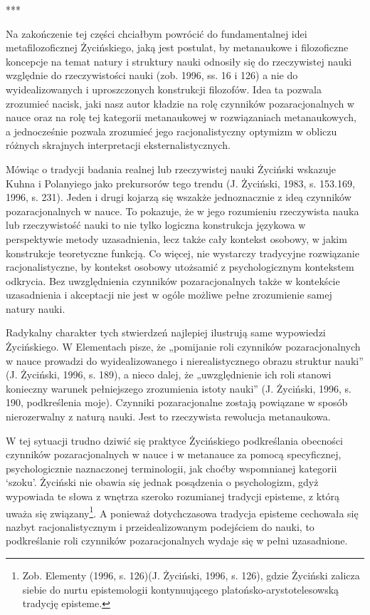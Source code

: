 \documentclass{article}
\begin{document}
***

Na zakończenie tej części chciałbym powrócić do fundamentalnej idei metafilozoficznej Życińskiego, jaką jest postulat,
by metanaukowe i filozoficzne koncepcje na temat natury i struktury nauki odnosiły się do rzeczywistej nauki względnie
do rzeczywistości nauki (zob. 1996, ss. 16 i 126) a nie do wyidealizowanych i uproszczonych konstrukcji filozofów. Idea
ta pozwala zrozumieć nacisk, jaki nasz autor kładzie na rolę czynników pozaracjonalnych w nauce oraz na rolę tej
kategorii metanaukowej w rozwiązaniach metanaukowych, a jednocześnie pozwala zrozumieć jego racjonalistyczny optymizm w
obliczu różnych skrajnych interpretacji eksternalistycznych.

Mówiąc o tradycji badania realnej lub rzeczywistej nauki Życiński wskazuje Kuhna i Polanyiego jako prekursorów tego
trendu \label{ref:RNDi6TPvuVUK4}(J. Życiński, 1983, s. 153.169, 1996, s. 231). Jeden i drugi kojarzą się wszakże
jednoznacznie z ideą czynników pozaracjonalnych w nauce. To pokazuje, że w jego rozumieniu rzeczywista nauka lub
rzeczywistość nauki to nie tylko logiczna konstrukcja językowa w perspektywie metody uzasadnienia, lecz także cały
kontekst osobowy, w jakim konstrukcje teoretyczne funkcją. Co więcej, nie wystarczy tradycyjne rozwiązanie
racjonalistyczne, by kontekst osobowy utożsamić z psychologicznym kontekstem odkrycia. Bez uwzględnienia czynników
pozaracjonalnych także w kontekście uzasadnienia i akceptacji nie jest w ogóle możliwe pełne zrozumienie samej natury
nauki.

Radykalny charakter tych stwierdzeń najlepiej ilustrują same wypowiedzi Życińskiego. W Elementach pisze, że „pomijanie
roli czynników pozaracjonalnych w nauce prowadzi do wyidealizowanego i nierealistycznego obrazu struktur nauki”
\label{ref:RND07iSFRLobf}(J. Życiński, 1996, s. 189), a nieco dalej, że „uwzględnienie ich roli stanowi konieczny
warunek pełniejszego zrozumienia istoty nauki” \label{ref:RNDVV3U1jSC9D}(J. Życiński, 1996, s. 190, podkreślenia moje).
 Czynniki pozaracjonalne zostają powiązane w sposób nierozerwalny z naturą nauki. Jest to rzeczywista rewolucja
metanaukowa.

W tej sytuacji trudno dziwić się praktyce Życińskiego podkreślania obecności czynników pozaracjonalnych w nauce i w
metanauce za pomocą specyficznej, psychologicznie naznaczonej terminologii, jak choćby wspomnianej kategorii ‘szoku’.
Życiński nie obawia się jednak posądzenia o psychologizm, gdyż wypowiada te słowa z wnętrza szeroko rozumianej tradycji
episteme, z którą uważa się związany\footnote{Zob. Elementy (1996, s. 126)\label{ref:RNDxQIHHr1tkz}(J. Życiński, 1996,
s. 126), gdzie Życiński zalicza siebie do nurtu epistemologii kontynuującego platońsko-arystotelesowską tradycję
episteme.}. A ponieważ dotychczasowa tradycja episteme cechowała się nazbyt racjonalistycznym i przeidealizowanym
podejściem do nauki, to podkreślanie roli czynników pozaracjonalnych wydaje się w pełni uzasadnione.
\end{document}
